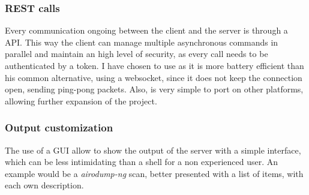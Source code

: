 \documentclass[../PiTest.tex]{subfiles}
\begin{document}
    \subsubsection{REST calls}
    Every communication ongoing between the client and the server is through a \REST API. This way the client can manage multiple asynchronous commands in parallel and maintain an high level of security, as every call needs to be authenticated by a token. I have chosen to use \REST as it is more battery efficient than his common alternative, using a websocket, since it does not keep the connection open, sending ping-pong packets. Also, \REST is very simple to port on other platforms, allowing further expansion of the project.

    \subsubsection{Output customization}
    The use of a GUI allow to show the output of the server with a simple interface, which can be less intimidating than a shell for a non experienced user. An example would be a \textit{airodump-ng} scan, better presented with a list of items, with each own description.
\end{document}
